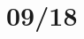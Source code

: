 \documentclass[../../rtnotes.tex]{subfiles}
\begin{document}
\section{09/18}
\subsection{}
\end{document}
